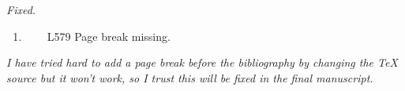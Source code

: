 \documentclass[]{article}
\providecommand{\tightlist}{%
  \setlength{\itemsep}{0pt}\setlength{\parskip}{0pt}}
\begin{document}
\begin{adjustwidth}{1cm}{} \textit{
Fixed.
} \end{adjustwidth}

\begin{enumerate}
\def\labelenumi{\arabic{enumi}.}
\setcounter{enumi}{21}
\tightlist
\item
  ~~~~L579 Page break missing.
\end{enumerate}

\begin{adjustwidth}{1cm}{} \textit{
I have tried hard to add a page break before the bibliography by changing the TeX source but it won't work, so I trust this will be fixed in the final manuscript.
} \end{adjustwidth}
\end{document}
